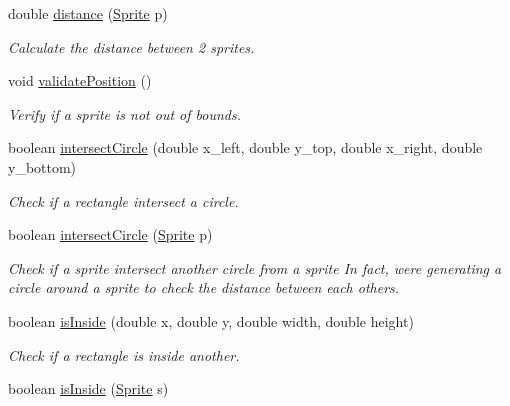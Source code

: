 \begin{DoxyCompactItemize}
double \hyperlink{classfr_1_1groupe40_1_1projet_1_1model_1_1_sprite_af42e0eb11d2408ca1f4bbb17164e3b24}{distance} (\hyperlink{classfr_1_1groupe40_1_1projet_1_1model_1_1_sprite}{Sprite} p)
\begin{DoxyCompactList}\small\item\em Calculate the distance between 2 sprites. \end{DoxyCompactList}\item 
\mbox{\label{classfr_1_1groupe40_1_1projet_1_1model_1_1_sprite_a38a7ee4fb45129e891b8a78a120ffe94}} 
void \hyperlink{classfr_1_1groupe40_1_1projet_1_1model_1_1_sprite_a38a7ee4fb45129e891b8a78a120ffe94}{validate\+Position} ()
\begin{DoxyCompactList}\small\item\em Verify if a sprite is not out of bounds. \end{DoxyCompactList}\item 
boolean \hyperlink{classfr_1_1groupe40_1_1projet_1_1model_1_1_sprite_a2a5da521a659f398efee6f2b0a45aa51}{intersect\+Circle} (double x\+\_\+left, double y\+\_\+top, double x\+\_\+right, double y\+\_\+bottom)
\begin{DoxyCompactList}\small\item\em Check if a rectangle intersect a circle. \end{DoxyCompactList}\item 
boolean \hyperlink{classfr_1_1groupe40_1_1projet_1_1model_1_1_sprite_a87346b18a5d8370e1f0634011698675b}{intersect\+Circle} (\hyperlink{classfr_1_1groupe40_1_1projet_1_1model_1_1_sprite}{Sprite} p)
\begin{DoxyCompactList}\small\item\em Check if a sprite intersect another circle from a sprite In fact, we\textquotesingle{}re generating a circle around a sprite to check the distance between each others. \end{DoxyCompactList}\item 
boolean \hyperlink{classfr_1_1groupe40_1_1projet_1_1model_1_1_sprite_a7c826b664373d244725751f74c057b12}{is\+Inside} (double x, double y, double width, double height)
\begin{DoxyCompactList}\small\item\em Check if a rectangle is inside another. \end{DoxyCompactList}\item 
boolean \hyperlink{classfr_1_1groupe40_1_1projet_1_1model_1_1_sprite_a2c39c997fa632f4d90807fdaa3a4a9b4}{is\+Inside} (\hyperlink{classfr_1_1groupe40_1_1projet_1_1model_1_1_sprite}{Sprite} s)

\end{DoxyCompactItemize}
